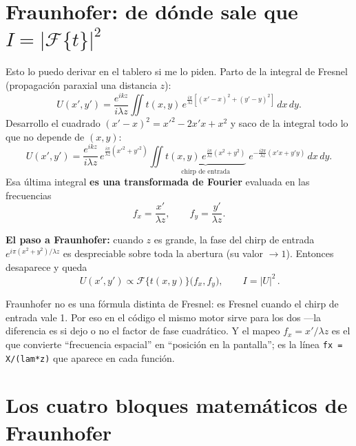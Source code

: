 \documentclass[11pt,a4paper]{article}
\newcommand{\Fou}{\mathcal{F}}
\begin{document}
\section{Fraunhofer: de dónde sale que \texorpdfstring{$I=|\Fou\{t\}|^2$}{I=|FT|2}}

Esto lo puedo derivar en el tablero si me lo piden. Parto de la integral de
Fresnel (propagación paraxial una distancia $z$):
\begin{equation}
U(x',y') = \frac{e^{ikz}}{i\lambda z}
\iint t(x,y)\,
e^{\frac{i\pi}{\lambda z}\left[(x'-x)^2+(y'-y)^2\right]}\,dx\,dy .
\label{eq:fresnel}
\end{equation}
Desarrollo el cuadrado $(x'-x)^2 = x'^2 - 2x'x + x^2$ y saco de la integral todo lo
que no depende de $(x,y)$:
\begin{equation}
U(x',y') = \frac{e^{ikz}}{i\lambda z}\,
e^{\frac{i\pi}{\lambda z}(x'^2+y'^2)}
\iint \underbrace{t(x,y)\,e^{\frac{i\pi}{\lambda z}(x^2+y^2)}}_{\text{chirp de entrada}}\;
e^{-\frac{i2\pi}{\lambda z}(x'x+y'y)}\,dx\,dy .
\label{eq:fresnelfft}
\end{equation}
Esa última integral \textbf{es una transformada de Fourier} evaluada en las
frecuencias
\begin{equation}
f_x=\frac{x'}{\lambda z},\qquad f_y=\frac{y'}{\lambda z}.
\label{eq:mapeo}
\end{equation}

\textbf{El paso a Fraunhofer:} cuando $z$ es grande, la fase del chirp de entrada
$e^{i\pi(x^2+y^2)/\lambda z}$ es despreciable sobre toda la abertura (su valor
$\to 1$). Entonces desaparece y queda
\begin{equation}
\boxed{\,U(x',y')\propto \Fou\{t(x,y)\}\big(f_x,f_y\big),\qquad I=|U|^2\, .}
\end{equation}

\begin{decir}
Fraunhofer no es una fórmula distinta de Fresnel: es Fresnel cuando el chirp de
entrada vale 1. Por eso en el código el mismo motor sirve para los dos ---la
diferencia es si dejo o no el factor de fase cuadrático. Y el mapeo
$f_x=x'/\lambda z$ es el que convierte ``frecuencia espacial'' en ``posición en la
pantalla''; es la línea \texttt{fx = X/(lam*z)} que aparece en cada función.
\end{decir}

\section{Los cuatro bloques matemáticos de Fraunhofer}
\label{sec:bloques}
\end{document}
